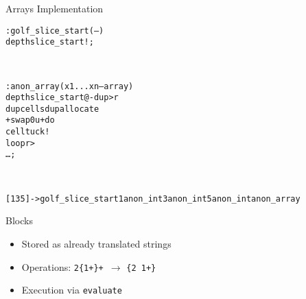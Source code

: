 \documentclass{beamer}
\begin{document}
\begin{frame}
  Arrays Implementation

  \vspace{0.5cm}

    \begin{alltt}
      \scriptsize
      : golf\_slice\_start ( -- ) \\
      \quad depth slice\_start ! ;
    \end{alltt}\\

    \begin{alltt}
      \scriptsize
      : anon\_array ( x1 ... xn -- array ) \\
      \quad depth slice\_start @ - dup >r \\
      \quad dup cells dup  allocate \\
      \quad + swap 0 u+do \\
      \qquad cell tuck ! \\
      \quad loop r> \\
      \quad \dots ; \\
    \end{alltt}\\

    \begin{alltt}
      \scriptsize
      [1 3 5] -> golf\_slice\_start 1 anon\_int 3 anon\_int  5 anon\_int anon\_array
    \end{alltt}
\end{frame}

\begin{frame}
    Blocks

    \begin{itemize}
        \item Stored as already translated strings
        \item Operations: \texttt{2\{1+\}+ }$\rightarrow$ \texttt{\{2 1+\}}
        \item Execution via \texttt{evaluate}
    \end{itemize}
\end{frame}
\end{document}
